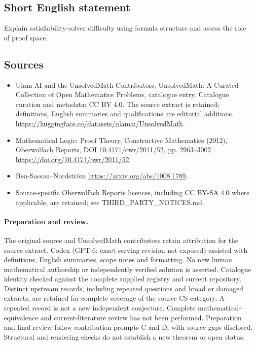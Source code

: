 \documentclass[11pt]{article}
\begin{document}
\subsection{Short English statement}
Explain satisfiability-solver difficulty using formula structure and assess the role of proof space.
\subsection{Sources}
\begin{itemize}
\item[\hypertarget{source:statement:1}{S1}] Ulam AI and the UnsolvedMath Contributors, UnsolvedMath: A Curated Collection of Open Mathematics Problems, catalogue entry. Catalogue curation and metadata: CC BY 4.0. The source extract is retained; definitions, English summaries and qualifications are editorial additions.
\url{https://huggingface.co/datasets/ulamai/UnsolvedMath}.
\item[\hypertarget{source:statement:2}{S2}] Mathematical Logic: Proof Theory, Constructive Mathematics (2012), Oberwolfach Reports, DOI 10.4171/owr/2011/52, pp. 2963--3002
\url{https://doi.org/10.4171/owr/2011/52}.
\item[\hypertarget{source:statement:3}{S3}] Ben-Sasson--Nordström
\url{https://arxiv.org/abs/1008.1789}.
\item Source-specific Oberwolfach Reports licences, including CC BY-SA 4.0 where applicable, are retained; see THIRD\_PARTY\_NOTICES.md.
\end{itemize}
\paragraph{Preparation and review.}
The original source and UnsolvedMath contributors retain attribution for the source extract. Codex (GPT-6; exact serving revision not exposed) assisted with definitions, English summaries, scope notes and formatting. No new human mathematical authorship or independently verified solution is asserted. Catalogue identity checked against the complete supplied registry and current repository. Distinct upstream records, including repeated questions and broad or damaged extracts, are retained for complete coverage of the source CS category. A repeated record is not a new independent conjecture. Complete mathematical-equivalence and current-literature review has not been performed. Preparation and final review follow contribution prompts C and D, with source gaps disclosed. Structural and rendering checks do not establish a new theorem or open status.
\label{end:statement}
\end{document}
